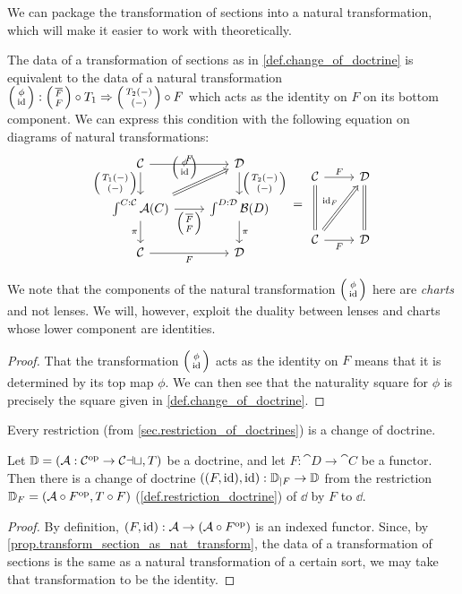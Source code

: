 \documentclass[DynamicalBook]{subfiles}
\begin{document}
We can package the transformation of sections into a natural transformation,
which will make it easier to work with theoretically.
\begin{proposition}\label{prop.transform_section_as_nat_transform}
The data of a transformation of sections as in \cref{def.change_of_doctrine} is equivalent to the data
of a natural transformation $\lens{\phi}{\id} : \lens{\overline{F}}{F} \circ T_1
    \Rightarrow \lens{T_2(-)}{(-)} \circ F$ which acts as the identity on $F$ on
    its bottom component. We can express this condition with the following equation on
    diagrams of natural transformations: 
    \[
\begin{tikzcd}
  \cat{C} \ar[d,"{\lens{T_1(-)}{(-)}}"'] \ar[r, "F"] & \cat{D} \ar[d,
  "{\lens{T_2(-)}{(-)}}"] \\
\int^{C : \cat{C}}\cat{A}(C) \ar[r, "\lens{\overline{F}}{F}"'] \ar[ur,
Rightarrow, "{\lens{\phi}{\id}}"] \ar[d,"\pi"'] & \int^{D :
  \cat{D}} \cat{B}(D) \ar[d, "\pi"]\\
\cat{C} \ar[r, "F"'] & \cat{D}
\end{tikzcd} 
=
\begin{tikzcd}
  \cat{C} \ar[dd, equals] \ar[r, "F"] & \cat{D} \ar[dd, equals] \\
  & \\
\cat{C} \ar[r, "F"'] \ar[uur, Rightarrow, "\id_F"] & \cat{D}
\end{tikzcd}
\]
\end{proposition}
\begin{remark}
  We note that the components of the natural transformation $\lens{\phi}{\id}$
  here are \emph{charts} and not lenses. We will, however, exploit the duality
  between lenses and charts whose lower component are identities.
\end{remark}
\begin{proof}
  That the transformation $\lens{\phi}{\id}$ acts as the identity on $F$ means
  that it is determined by its top map $\phi$. We can then see that the
  naturality square for $\phi$ is precisely the square given in \cref{def.change_of_doctrine}.
\end{proof}


Every restriction (from \cref{sec.restriction_of_doctrines}) is a change of doctrine.
\begin{proposition}
Let $\mathbb{D} = (\mathcal{A} : \mathcal{C}^{\textnormal{op}} \to \mathcal{Cat}, T)$ be a doctrine, and let $F :
\cat{D} \to \cat{C}$ be a functor. Then there is a change of doctrine $((F,
\mathrm{id}), \mathrm{id}) : \mathbb{D}_{|F} \to \mathbb{D}$ from the restriction $\mathbb{D}_F = (\mathcal{A} \circ
F^{\textnormal{op}}, T \circ F)$ (\cref{def.restriction_doctrine}) of $\dd$ by $F$ to $\dd$.
\end{proposition}
\begin{proof}
By definition, $(F, \mathrm{id}) : \mathcal{A} \to (\mathcal{A} \circ F^{\textnormal{op}})$ is an indexed
functor. Since, by \cref{prop.transform_section_as_nat_transform}, the data of a
transformation of sections is the same as a natural transformation of a certain
sort, we may take that transformation to be the identity.
\end{proof}
\end{document}
